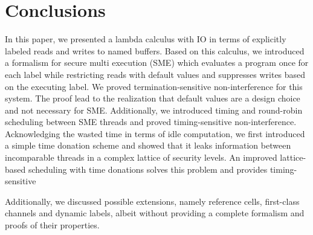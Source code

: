 \documentclass[10pt,preprint]{sigplanconf}
\begin{document}

\section{Conclusions}

In this paper, we presented a lambda calculus with IO in terms of explicitly labeled reads and writes to named buffers.  Based on this calculus, we introduced a formalism for secure multi execution (SME) which evaluates a program once for each label while restricting reads with default values and suppresses writes based on the executing label.  We proved termination-sensitive non-interference for this system.  The proof lead to the realization that default values are a design choice and not necessary for SME.  Additionally, we introduced timing and round-robin scheduling between SME threads and proved timing-sensitive non-interference.  Acknowledging the wasted time in terms of idle computation, we first introduced a simple time donation scheme and showed that it leaks information between incomparable threads in a complex lattice of security levels.  An improved lattice-based scheduling with time donations solves this problem and provides timing-sensitive 

Additionally, we discussed possible extensions, namely reference cells, first-class channels and dynamic labels, albeit without providing a complete formalism and proofs of their properties.



\end{document}
